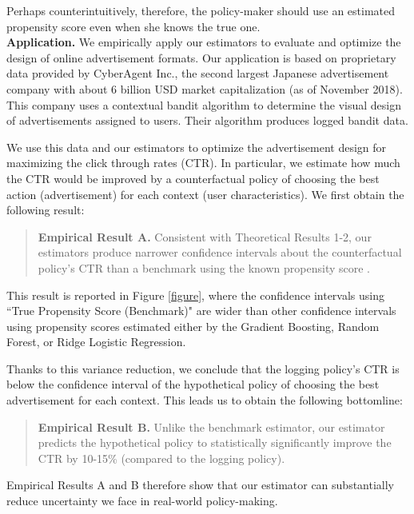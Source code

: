 \documentclass[letterpaper]{article} \usepackage{aaai19}  \usepackage{times}  \usepackage{helvet}  \usepackage{courier}  \usepackage{url}  \usepackage{graphicx}  \frenchspacing  \usepackage{comment}
\begin{document}
\noindent Perhaps counterintuitively, therefore, the policy-maker should use an estimated propensity score even when she knows the true one. \\

\textbf{Application.} We empirically apply our estimators to evaluate and optimize the design of online advertisement formats. 
Our application is based on proprietary data provided by CyberAgent Inc., the second largest Japanese advertisement company with about 6 billion USD market capitalization (as of November 2018). 
This company uses a contextual bandit algorithm to determine the visual design of advertisements assigned to users. 
Their algorithm produces logged bandit data. 

We use this data and our estimators to optimize the advertisement design for maximizing the click through rates (CTR). 
In particular, we estimate how much the CTR would be improved by a counterfactual policy of choosing the best action (advertisement) for each context (user characteristics). 
We first obtain the following result: 

\begin{quote}
\textbf{Empirical Result A.} Consistent with Theoretical Results 1-2, our estimators produce narrower confidence intervals about the counterfactual policy's CTR than a benchmark using the known propensity score \cite{Swaminathan2015b}. 
\end{quote}

\noindent This result is reported in Figure \ref{figure}, where the confidence intervals using ``True Propensity Score (Benchmark)" are wider than other confidence intervals using propensity scores estimated either by the Gradient Boosting, Random Forest, or Ridge Logistic Regression. 

Thanks to this variance reduction, we conclude that the logging policy's CTR is below the confidence interval of the hypothetical policy of choosing the best advertisement for each context. 
This leads us to obtain the following bottomline: 

\begin{quote}
\textbf{Empirical Result B.} Unlike the benchmark estimator, our estimator predicts the hypothetical policy to statistically significantly improve the CTR by 10-15\% (compared to the logging policy). 
\end{quote}

\noindent Empirical Results A and B therefore show that our estimator can substantially reduce uncertainty we face in real-world policy-making. 
\end{document}
